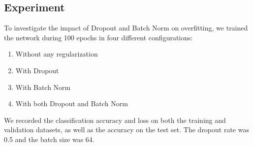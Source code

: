 \documentclass[a4paper]{article}
\begin{document}
\subsection{Experiment}

To investigate the impact of Dropout and Batch Norm on overfitting, we trained the network during 100 epochs in four different configurations: 
\begin{enumerate}
    \item Without any regularization
    \item With Dropout
    \item With Batch Norm
    \item With both Dropout and Batch Norm
\end{enumerate}
We recorded the classification accuracy and loss on both the training and validation datasets, as well as the accuracy on the test set. The dropout rate was 0.5 and the batch size was 64.
\end{document}
